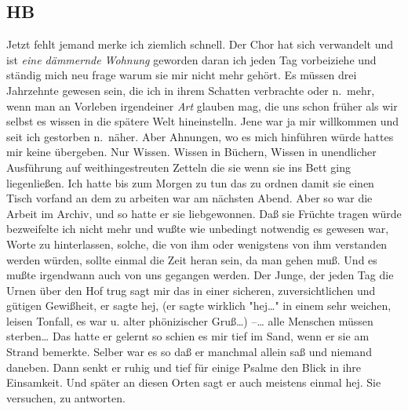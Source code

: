 \documentclass[
]{article}
\author{}
\date{\vspace{-2.5em}}
\begin{document}
\subsection{HB}\label{hb}

Jetzt fehlt jemand merke ich ziemlich schnell. Der Chor hat sich
verwandelt und ist \emph{eine dämmernde Wohnung} geworden daran ich
jeden Tag vorbeiziehe und ständig mich neu frage warum sie mir nicht
mehr gehört. Es müssen drei Jahrzehnte gewesen sein, die ich in ihrem
Schatten verbrachte oder n.~mehr, wenn man an Vorleben irgendeiner
\emph{Art} glauben mag, die uns schon früher als wir selbst es wissen in
die spätere Welt hineinstelln. Jene war ja mir willkommen und seit ich
gestorben n.~näher. Aber Ahnungen, wo es mich hinführen würde hattes mir
keine übergeben. Nur Wissen. Wissen in Büchern, Wissen in unendlicher
Ausführung auf weithingestreuten Zetteln die sie wenn sie ins Bett ging
liegenließen. Ich hatte bis zum Morgen zu tun das zu ordnen damit sie
einen Tisch vorfand an dem zu arbeiten war am nächsten Abend. Aber so
war die Arbeit im Archiv, und so hatte er sie liebgewonnen. Daß sie
Früchte tragen würde bezweifelte ich nicht mehr und wußte wie unbedingt
notwendig es gewesen war, Worte zu hinterlassen, solche, die von ihm
oder wenigstens von ihm verstanden werden würden, sollte einmal die Zeit
heran sein, da man gehen muß. Und es mußte irgendwann auch von uns
gegangen werden. Der Junge, der jeden Tag die Urnen über den Hof trug
sagt mir das in einer sicheren, zuversichtlichen und gütigen Gewißheit,
er sagte hej, (er sagte wirklich "hej\ldots" in einem sehr weichen,
leisen Tonfall, es war u. alter phönizischer Gruß\ldots) --\ldots{} alle
Menschen müssen sterben\ldots{} Das hatte er gelernt so schien es mir
tief im Sand, wenn er sie am Strand bemerkte. Selber war es so daß er
manchmal allein saß und niemand daneben. Dann senkt er ruhig und tief
für einige Psalme den Blick in ihre Einsamkeit. Und später an diesen
Orten sagt er auch meistens einmal hej. Sie versuchen, zu antworten.
\end{document}

